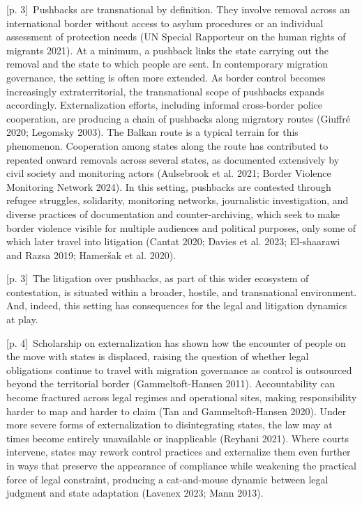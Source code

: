 \documentclass[10pt,a4paper]{article}
\begin{document}
{\scriptsize\color{gray} [p. 3]}\ Pushbacks are transnational by definition. They involve removal across an international border without access to asylum procedures or an individual assessment of protection needs (UN Special Rapporteur on the human rights of migrants 2021). At a minimum, a pushback links the state carrying out the removal and the state to which people are sent. In contemporary migration governance, the setting is often more extended. As border control becomes increasingly extraterritorial, the transnational scope of pushbacks expands accordingly. Externalization efforts, including informal cross-border police cooperation, are producing a chain of pushbacks along migratory routes (Giuffré 2020; Legomsky 2003). The Balkan route is a typical terrain for this phenomenon. Cooperation among states along the route has contributed to repeated onward removals across several states, as documented extensively by civil society and monitoring actors (Aulsebrook et al. 2021; Border Violence Monitoring Network 2024). In this setting, pushbacks are contested through refugee struggles, solidarity, monitoring networks, journalistic investigation, and diverse practices of documentation and counter-archiving, which seek to make border violence visible for multiple audiences and political purposes, only some of which later travel into litigation (Cantat 2020; Davies et al. 2023; El-shaarawi and Razsa 2019; Hameršak et al. 2020).\par
{\scriptsize\color{gray} [p. 3]}\ The litigation over pushbacks, as part of this wider ecosystem of contestation, is situated within a broader, hostile, and transnational environment. And, indeed, this setting has consequences for the legal and litigation dynamics at play.\par
{\scriptsize\color{gray} [p. 4]}\ Scholarship on externalization has shown how the encounter of people on the move with states is displaced, raising the question of whether legal obligations continue to travel with migration governance as control is outsourced beyond the territorial border (Gammeltoft-Hansen 2011). Accountability can become fractured across legal regimes and operational sites, making responsibility harder to map and harder to claim (Tan and Gammeltoft-Hansen 2020). Under more severe forms of externalization to disintegrating states, the law may at times become entirely unavailable or inapplicable (Reyhani 2021). Where courts intervene, states may rework control practices and externalize them even further in ways that preserve the appearance of compliance while weakening the practical force of legal constraint, producing a cat-and-mouse dynamic between legal judgment and state adaptation (Lavenex 2023; Mann 2013).\par
\end{document}
